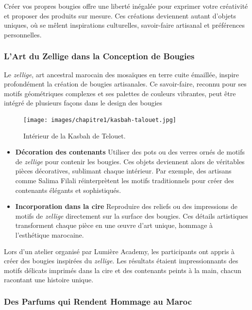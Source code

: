 \documentclass[11pt,fleqn,onecolumn,oneside]{book}
\begin{document}
Créer vos propres bougies offre une liberté inégalée pour exprimer votre créativité et proposer des produits sur mesure. Ces créations deviennent autant d’objets uniques, où se mêlent inspirations culturelles, savoir-faire artisanal et préférences personnelles.

\subsubsection*{L’Art du Zellige dans la Conception de Bougies}

Le \textit{zellige}, art ancestral marocain des mosaïques en terre cuite émaillée, inspire profondément la création de bougies artisanales. Ce savoir-faire, reconnu pour ses motifs géométriques complexes et ses palettes de couleurs vibrantes, peut être intégré de plusieurs façons dans le design des bougies

\begin{figure}[htbp]
    \centering
    \texttt{[image: images/chapitre1/kasbah-talouet.jpg]}
    \caption{Intérieur de la Kasbah de Telouet.}
    \label{fig:cedrus_atlantica}
\end{figure}

\begin{itemize}
    \item \textbf{Décoration des contenants} Utiliser des pots ou des verres ornés de motifs de \textit{zellige} pour contenir les bougies. Ces objets deviennent alors de véritables pièces décoratives, sublimant chaque intérieur. Par exemple, des artisans comme Salima Filali réinterprètent les motifs traditionnels pour créer des contenants élégants et sophistiqués.
    \item \textbf{Incorporation dans la cire} Reproduire des reliefs ou des impressions de motifs de \textit{zellige} directement sur la surface des bougies. Ces détails artistiques transforment chaque pièce en une œuvre d’art unique, hommage à l’esthétique marocaine.
\end{itemize}

\begin{example}
Lors d’un atelier organisé par Lumière Academy, les participants ont appris à créer des bougies inspirées du \textit{zellige}. Les résultats étaient impressionnants des motifs délicats imprimés dans la cire et des contenants peints à la main, chacun racontant une histoire unique.
\end{example}

\subsubsection*{Des Parfums qui Rendent Hommage au Maroc}
\end{document}
